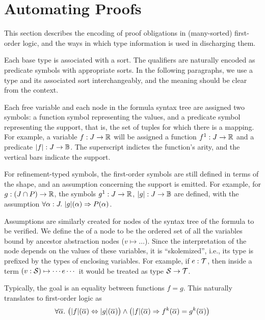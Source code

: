 \section{Automating Proofs}

This section describes the encoding of proof obligations in (many-sorted) first-order logic,
and the ways in which type information is used in discharging them.

Each base type is associated with a sort. The qualifiers are naturally encoded
as predicate symbols with appropriate sorts. In the following paragraphs, we
use a type and its associated sort interchangeably, and the meaning should be clear
from the context.

Each free variable and each node in the formula syntax tree are assigned two
symbols: a function symbol representing the values, and a predicate symbol
representing the support, that is, the set of tuples for which there is a mapping.
For example, a variable $f : J\to\R$ will be assigned a function $f^1: J\to\R$
and a predicate $|f|: J\to\B$. The superscript indictes the function's arity,
and the vertical bars indicate the support.

For refinement-typed symbols, the first-order symbols are still defined in terms
of the shape, and an assumption concerning the support is emitted. For example,
for $g: (J\cap P)\to\R$, the symbols $g^1:J\to\R$, $|g|:J\to\B$ are defined,
with the assumption $\forall \alpha:J.~|g|(\alpha)\limplies P(\alpha)$.

Assumptions are similarly created for nodes of the syntax tree of the formula to
be verified. We define the  of a node to be the ordered set of
all the variables bound by ancestor abstraction nodes ($v\mapsto\ldots$). Since
the interpretation of the node depends on the values of these variables, it is
``skolemized'', i.e., its type is prefixed by the types of enclosing variables.
For example, if $e:\T$, then inside a term $(v:\S)\mapsto \cdots e\cdots$ it would be treated as
type $\S\to\T$.

Typically, the goal is an equality between functions $f=g$. This naturally translates
to first-order logic as
\[\forall\overline{\alpha}.~\big(|f|(\overline\alpha)\liff|g|(\overline\alpha)\big) \land
  \big(|f|(\overline\alpha) \limplies f^k(\overline\alpha)=g^k(\overline\alpha)\big)\]

